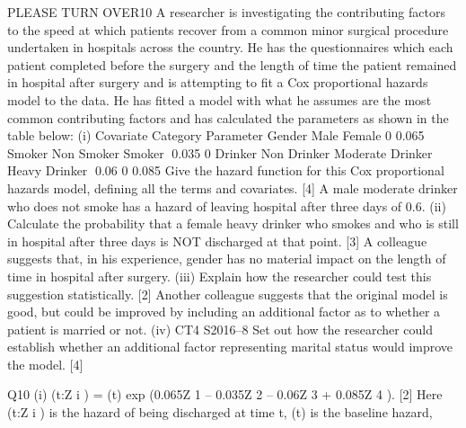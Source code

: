 \documentclass[a4paper,12pt]{article}
\begin{document}
PLEASE TURN OVER10
A researcher is investigating the contributing factors to the speed at which patients
recover from a common minor surgical procedure undertaken in hospitals across the
country. He has the questionnaires which each patient completed before the surgery
and the length of time the patient remained in hospital after surgery and is attempting
to fit a Cox proportional hazards model to the data.
He has fitted a model with what he assumes are the most common contributing factors
and has calculated the parameters as shown in the table below:
(i)
Covariate Category Parameter
Gender Male
Female 0
0.065
Smoker Non Smoker
Smoker 0.035
0
Drinker Non Drinker
Moderate Drinker
Heavy Drinker 0.06
0
0.085
Give the hazard function for this Cox proportional hazards model, defining all
the terms and covariates.
[4]
A male moderate drinker who does not smoke has a hazard of leaving hospital after
three days of 0.6.
(ii)
Calculate the probability that a female heavy drinker who smokes and who is
still in hospital after three days is NOT discharged at that point.
[3]
A colleague suggests that, in his experience, gender has no material impact on the
length of time in hospital after surgery.
(iii)
Explain how the researcher could test this suggestion statistically.
[2]
Another colleague suggests that the original model is good, but could be improved by
including an additional factor as to whether a patient is married or not.
(iv)
CT4 S2016–8
Set out how the researcher could establish whether an additional factor
representing marital status would improve the model.
[4]


Q10
(i)
\lambda(t:Z i ) =  (t) exp (0.065Z 1 – 0.035Z 2 – 0.06Z 3 + 0.085Z 4 ).
[2]
Here
\lambda(t:Z i ) is the hazard of being discharged at time t,
 (t) is the baseline hazard,
\end{document}
